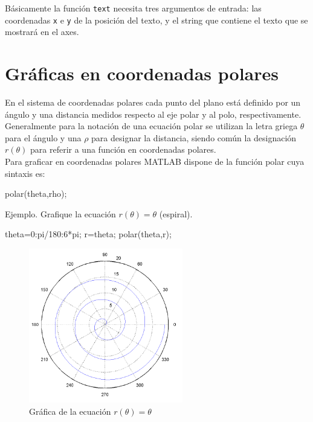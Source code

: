Básicamente la función \texttt{text} necesita tres argumentos de entrada: las 
coordenadas \texttt{x} e \texttt{y} de la posición del texto, y el string 
que contiene el texto que se mostrará en el axes.

\section{Gráficas en coordenadas polares}

En el sistema de coordenadas polares cada punto del plano está definido
por un ángulo y una distancia medidos respecto al eje polar y al polo,
respectivamente. Generalmente para la notación de una ecuación polar se
utilizan la letra griega $\theta$ para el ángulo y una $\rho$ 
para designar la distancia, siendo común la designación $r(\theta)$
para referir a una función en coordenadas polares. \\

Para graficar en coordenadas polares MATLAB dispone de la función polar
cuya sintaxis es:

\begin{matlab}
polar(theta,rho);
\end{matlab}

Ejemplo. Grafique la ecuación $ r(\theta) = \theta $ (espiral).

\begin{matlab}
theta=0:pi/180:6*pi;
r=theta;
polar(theta,r);
\end{matlab}

\begin{figure}[htbp]
    \centering
    \includegraphics[width=0.6\textwidth]{images/ch4/img_4_6.png}
    \caption{Gráfica de la ecuación $r(\theta) = \theta$}
    \label{fig:img_4_6}
\end{figure}

